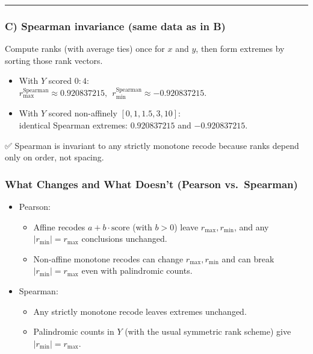 \documentclass[
  12pt,
]{article}
\theoremstyle{plain}
\theoremstyle{definition}
\theoremstyle{remark}
\begin{document}
\begin{center}\rule{0.5\linewidth}{0.5pt}\end{center}

\subsubsection{C) Spearman invariance (same data as in
B)}\label{c-spearman-invariance-same-data-as-in-b}

Compute ranks (with average ties) once for \(x\) and \(y\), then form
extremes by sorting those rank vectors.

\begin{itemize}
\item
  With \(Y\) scored \(0{:}4\):\\
  \(r_{\max}^{\text{Spearman}}\approx 0.920837215,\ \ r_{\min}^{\text{Spearman}}\approx -0.920837215\).
\item
  With \(Y\) scored non-affinely \([0,1,1.5,3,10]\):\\
  identical Spearman extremes: \(0.920837215\) and \(-0.920837215\).
\end{itemize}

✅ Spearman is invariant to any strictly monotone recode because ranks
depend only on order, not spacing.

\subsubsection{What Changes and What Doesn't (Pearson
vs.~Spearman)}\label{what-changes-and-what-doesnt-pearson-vs.-spearman}

\begin{itemize}
\item
  Pearson:

  \begin{itemize}
  \item
    Affine recodes \(a+b\cdot\text{score}\) (with \(b>0\)) leave
    \(r_{\max}, r_{\min}\), and any \(|r_{\min}|=r_{\max}\) conclusions
    unchanged.
  \item
    Non-affine monotone recodes can change \(r_{\max}, r_{\min}\) and
    can break \(|r_{\min}|=r_{\max}\) even with palindromic counts.
  \end{itemize}
\item
  Spearman:

  \begin{itemize}
  \item
    Any strictly monotone recode leaves extremes unchanged.
  \item
    Palindromic counts in \(Y\) (with the usual symmetric rank scheme)
    give \(|r_{\min}|=r_{\max}\).
  \end{itemize}
\end{itemize}
\end{document}
